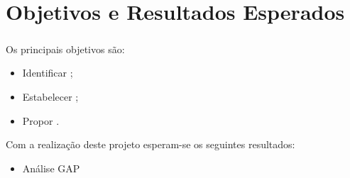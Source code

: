 \chapter*{\thechapter \quad Objetivos e Resultados Esperados}
\paragraph{}

Os principais objetivos são:
\begin{itemize}
   \item Identificar ;
   \item Estabelecer ;
   \item Propor .
\end{itemize}

Com a realização deste projeto esperam-se os seguintes resultados:
\begin{itemize}
   \item Análise GAP 
\end{itemize}

